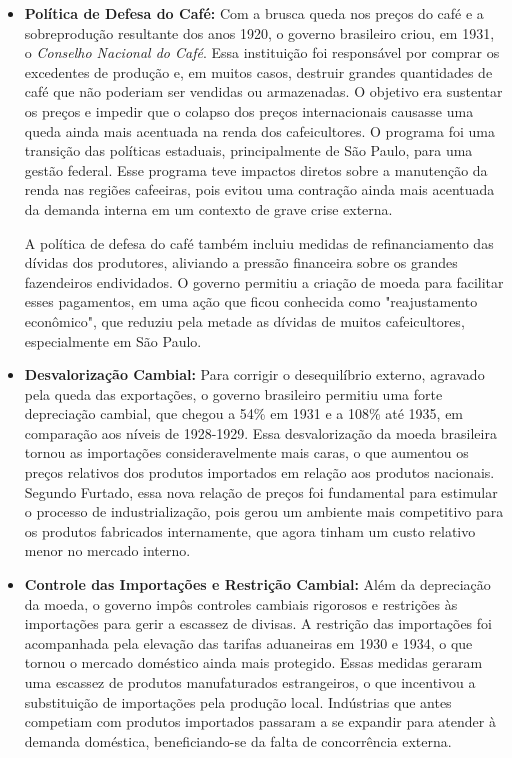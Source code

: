 \documentclass[a4paper,12pt]{article}[abntex2]
\begin{document}
\begin{itemize}
    \item \textbf{Política de Defesa do Café:} 
    Com a brusca queda nos preços do café e a sobreprodução resultante dos anos 1920, o governo brasileiro criou, em 1931, o \textit{Conselho Nacional do Café}. Essa instituição foi responsável por comprar os excedentes de produção e, em muitos casos, destruir grandes quantidades de café que não poderiam ser vendidas ou armazenadas. O objetivo era sustentar os preços e impedir que o colapso dos preços internacionais causasse uma queda ainda mais acentuada na renda dos cafeicultores. O programa foi uma transição das políticas estaduais, principalmente de São Paulo, para uma gestão federal. Esse programa teve impactos diretos sobre a manutenção da renda nas regiões cafeeiras, pois evitou uma contração ainda mais acentuada da demanda interna em um contexto de grave crise externa.
    
    A política de defesa do café também incluiu medidas de refinanciamento das dívidas dos produtores, aliviando a pressão financeira sobre os grandes fazendeiros endividados. O governo permitiu a criação de moeda para facilitar esses pagamentos, em uma ação que ficou conhecida como "reajustamento econômico", que reduziu pela metade as dívidas de muitos cafeicultores, especialmente em São Paulo.

    \item \textbf{Desvalorização Cambial:}
    Para corrigir o desequilíbrio externo, agravado pela queda das exportações, o governo brasileiro permitiu uma forte depreciação cambial, que chegou a 54\% em 1931 e a 108\% até 1935, em comparação aos níveis de 1928-1929. Essa desvalorização da moeda brasileira tornou as importações consideravelmente mais caras, o que aumentou os preços relativos dos produtos importados em relação aos produtos nacionais. Segundo Furtado, essa nova relação de preços foi fundamental para estimular o processo de industrialização, pois gerou um ambiente mais competitivo para os produtos fabricados internamente, que agora tinham um custo relativo menor no mercado interno.

    \item \textbf{Controle das Importações e Restrição Cambial:}
    Além da depreciação da moeda, o governo impôs controles cambiais rigorosos e restrições às importações para gerir a escassez de divisas. A restrição das importações foi acompanhada pela elevação das tarifas aduaneiras em 1930 e 1934, o que tornou o mercado doméstico ainda mais protegido. Essas medidas geraram uma escassez de produtos manufaturados estrangeiros, o que incentivou a substituição de importações pela produção local. Indústrias que antes competiam com produtos importados passaram a se expandir para atender à demanda doméstica, beneficiando-se da falta de concorrência externa.


\end{itemize}
\end{document}
